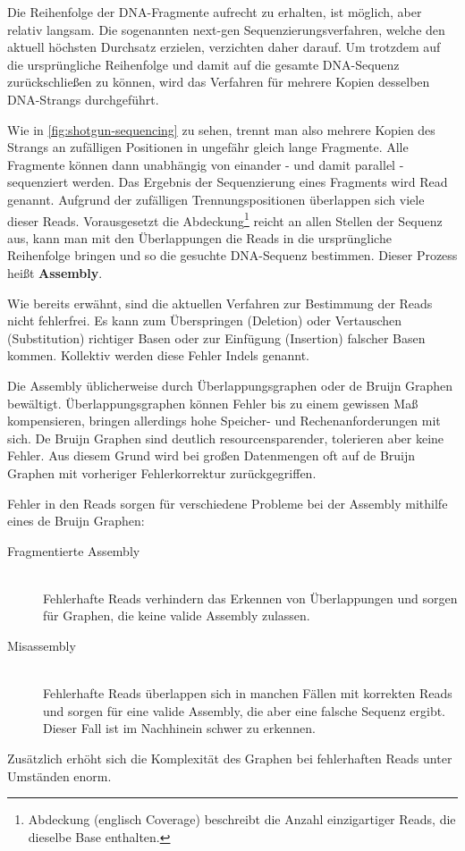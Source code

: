Die Reihenfolge der DNA-Fragmente aufrecht zu erhalten, ist möglich, aber relativ langsam.
Die sogenannten next-gen Sequenzierungsverfahren, welche den aktuell höchsten Durchsatz erzielen, verzichten daher darauf.
Um trotzdem auf die ursprüngliche Reihenfolge und damit auf die gesamte DNA-Sequenz zurückschließen zu können, wird das Verfahren für mehrere Kopien desselben DNA-Strangs durchgeführt.

Wie in \ref{fig:shotgun-sequencing} zu sehen, trennt man also mehrere Kopien des Strangs an zufälligen Positionen in ungefähr gleich lange Fragmente.
Alle Fragmente können dann unabhängig von einander - und damit parallel - sequenziert werden.
Das Ergebnis der Sequenzierung eines Fragments wird Read genannt.
Aufgrund der zufälligen Trennungspositionen überlappen sich viele dieser Reads.
Vorausgesetzt die Abdeckung\footnote{Abdeckung (englisch Coverage) beschreibt die Anzahl einzigartiger Reads, die dieselbe Base enthalten.}
reicht an allen Stellen der Sequenz aus, kann man mit den Überlappungen die Reads in die ursprüngliche Reihenfolge bringen und so die gesuchte DNA-Sequenz bestimmen.
Dieser Prozess heißt \textbf{Assembly}.

Wie bereits erwähnt, sind die aktuellen Verfahren zur Bestimmung der Reads nicht fehlerfrei.
Es kann zum Überspringen (Deletion) oder Vertauschen (Substitution) richtiger Basen oder zur Einfügung (Insertion) falscher Basen kommen.
Kollektiv werden diese Fehler Indels genannt.

Die Assembly üblicherweise durch Überlappungsgraphen oder de Bruijn Graphen bewältigt.
Überlappungsgraphen können Fehler bis zu einem gewissen Maß kompensieren, bringen allerdings hohe Speicher- und Rechenanforderungen mit sich.
De Bruijn Graphen sind deutlich resourcensparender, tolerieren aber keine Fehler.
Aus diesem Grund wird bei großen Datenmengen oft auf de Bruijn Graphen mit vorheriger Fehlerkorrektur zurückgegriffen.

Fehler in den Reads sorgen für verschiedene Probleme bei der Assembly mithilfe eines de Bruijn Graphen:
\begin{description}
	\item[Fragmentierte Assembly]\hfill \\
		Fehlerhafte Reads verhindern das Erkennen von Überlappungen und sorgen für Graphen, die keine valide Assembly zulassen.
	\item[Misassembly]\hfill \\
		Fehlerhafte Reads überlappen sich in manchen Fällen mit korrekten Reads und sorgen für eine valide Assembly, die aber eine falsche Sequenz ergibt. \\
		Dieser Fall ist im Nachhinein schwer zu erkennen.
\end{description}
Zusätzlich erhöht sich die Komplexität des Graphen bei fehlerhaften Reads unter Umständen enorm.

